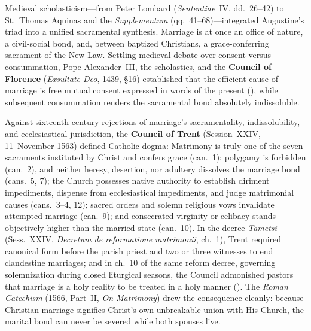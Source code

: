 Medieval scholasticism---from Peter Lombard (\emph{Sententiae}~IV, dd.~26--42) to St.~Thomas Aquinas and the \emph{Supplementum} (qq.~41--68)---integrated Augustine's triad into a unified sacramental synthesis. Marriage is at once an office of nature, a civil-social bond, and, between baptized Christians, a grace-conferring sacrament of the New Law. Settling medieval debate over consent versus consummation, Pope Alexander~III, the scholastics, and the \textbf{Council of Florence} (\emph{Exsultate Deo}, 1439, \S16) established that the efficient cause of marriage is free mutual consent expressed in words of the present (), while subsequent consummation renders the sacramental bond absolutely indissoluble.

Against sixteenth-century rejections of marriage's sacramentality, indissolubility, and ecclesiastical jurisdiction, the \textbf{Council of Trent} (Session~XXIV, 11~November 1563) defined Catholic dogma: Matrimony is truly one of the seven sacraments instituted by Christ and confers grace (can.~1); polygamy is forbidden (can.~2), and neither heresy, desertion, nor adultery dissolves the marriage bond (cans.~5, 7); the Church possesses native authority to establish diriment impediments, dispense from ecclesiastical impediments, and judge matrimonial causes (cans.~3--4, 12); sacred orders and solemn religious vows invalidate attempted marriage (can.~9); and consecrated virginity or celibacy stands objectively higher than the married state (can.~10). In the decree \emph{Tametsi} (Sess.~XXIV, \emph{Decretum de reformatione matrimonii}, ch.~1), Trent required canonical form before the parish priest and two or three witnesses to end clandestine marriages; and in ch.~10 of the same reform decree, governing solemnization during closed liturgical seasons, the Council admonished pastors that marriage is a holy reality to be treated in a holy manner (). The \emph{Roman Catechism} (1566, Part~II, \emph{On Matrimony}) drew the consequence cleanly: because Christian marriage signifies Christ's own unbreakable union with His Church, the marital bond can never be severed while both spouses live.

